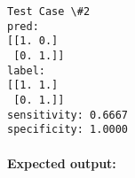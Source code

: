 \documentclass[11pt]{article}
\newenvironment{Shaded}{}{}
\newcommand{\FloatTok}[1]{\textcolor[rgb]{0.25,0.63,0.44}{{#1}}}
\newcommand{\CommentTok}[1]{\textcolor[rgb]{0.38,0.63,0.69}{\textit{{#1}}}}
\newcommand{\NormalTok}[1]{{#1}}
\begin{document}
    \begin{Verbatim}[commandchars=\\\{\}]
Test Case \#2
pred:
[[1. 0.]
 [0. 1.]]
label:
[[1. 1.]
 [0. 1.]]
sensitivity: 0.6667
specificity: 1.0000

    \end{Verbatim}

    \hypertarget{expected-output}{%
\paragraph{Expected output:}\label{expected-output}}

\begin{Shaded}
\end{Shaded}
\end{document}
